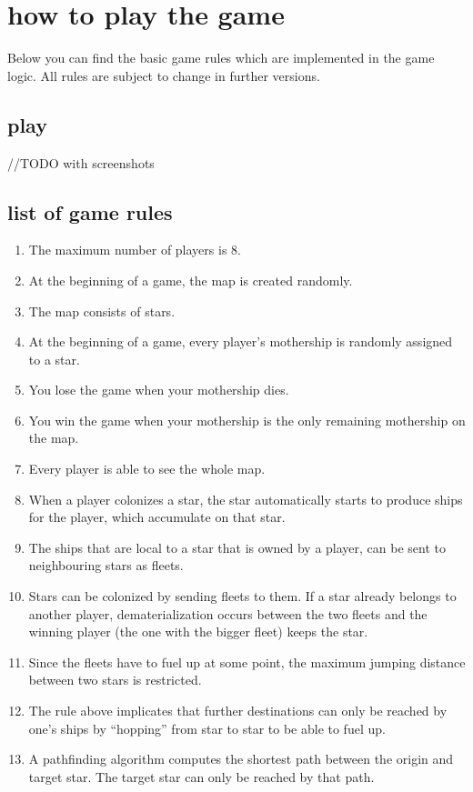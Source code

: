 \chapter*{how to play the game}
Below you can find the basic game rules which are implemented in the game logic. All rules are subject to change in further versions.

\section*{play}
//TODO with screenshots

\section*{list of game rules}
\begin{enumerate}
	\item The maximum number of players is 8.
	\item At the beginning of a game, the map is created randomly.
	\item The map consists of stars.
	\item At the beginning of a game, every player's mothership is randomly assigned to a star.
	\item You lose the game when your mothership dies.
	\item You win the game when your mothership is the only remaining mothership on the map.
	\item Every player is able to see the whole map.
	\item When a player colonizes a star, the star automatically starts to produce ships for the player, which accumulate on that star.
	\item The ships that are local to a star that is owned by a player, can be sent to neighbouring stars as fleets.
	\item Stars can be colonized by sending fleets to them. If a star already belongs to another player, dematerialization occurs between the two fleets and the winning player (the one with the bigger fleet) keeps the star.
	\item Since the fleets have to fuel up at some point, the maximum jumping distance between two stars is restricted.
	\item The rule above implicates   that further destinations can only be reached by one's ships by ``hopping'' from star to star to be able to fuel up.
	\item A pathfinding algorithm computes the shortest path between the origin and target star. The target star can only be reached by that path.

\end{enumerate}
